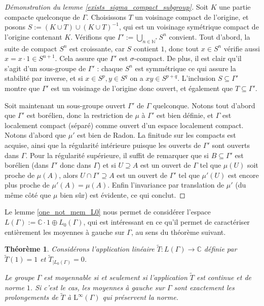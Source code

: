 \documentclass[a4paper,12pt]{article}
\newtheorem{theorem}{Théorème}[section]
\newcommand{\N}{\mathbb{N}}
\newcommand{\C}{\mathbb{C}}
\newcommand{\ssi}{si et seulement si }
\newcommand{\inv}{^{-1}}
\begin{document}
\begin{proof}[Démonstration du lemme \ref{exists_sigma_compact_subgroup}]
    Soit $K$ une partie compacte quelconque de $\Gamma$. Choisissons $T$ un voisinage compact de l'origine, 
    et posons $S := (K\cup T) \cup (K\cup T)\inv$, qui est un voisinage symétrique compact de l'origine 
    contenant $K$. Vérifions que $\Gamma' := \bigcup_{n\in\N^*} S^n$ convient. Tout d'abord, la suite de compact $S^n$ 
    est croissante, car $S$ contient $1$, donc tout $x\in S^n$ vérifie aussi $x = x\cdot 1\in S^{n+1}$. Cela assure que 
    $\Gamma'$ est $\sigma$-compact. De plus, il est clair qu'il s'agit d'un sous-groupe de $\Gamma'$ : chaque $S^n$ est
    symmétrique ce qui assure la stabilité par inverse, et si $x\in S^p, y\in S^q$ on a $xy \in S^{p+q}$. L'inclusion $S\subseteq\Gamma'$ 
    montre que $\Gamma'$ est un voisinage de l'origine donc ouvert, et également que $T\subseteq\Gamma'$.

    Soit maintenant un sous-groupe ouvert $\Gamma'$ de $\Gamma$ quelconque. Notons tout d'abord que 
    $\Gamma'$ est borélien, donc la restriction de $\mu$ à $\Gamma'$ est bien définie, et $\Gamma$ est localement compact 
    (séparé) comme ouvert d'un espace localement compact. Notons d'abord que $\mu'$ est bien de Radon. La 
    finitude sur les compacts est acquise, ainsi que la régularité intérieure puisque les ouverts de 
    $\Gamma'$ sont ouverts dans $\Gamma$. Pour la régularité supérieure, il suffit de remarquer que si 
    $B\subseteq\Gamma'$ est borélien (dans $\Gamma'$ donc dans $\Gamma$) et si $U\supseteq A$ est un ouvert de 
    $\Gamma$ tel que $\mu(U)$ soit proche de $\mu(A)$, alors $U\cap\Gamma'\supseteq A$ est un ouvert de 
    $\Gamma'$ tel que $\mu'(U)$ est encore plus proche de $\mu'(A) = \mu(A)$. Enfin l'invariance par translation de 
    $\mu'$ (du même côté que $\mu$ bien sûr) est évidente, ce qui conclut.
\end{proof}

Le lemme \ref{one_not_mem_L0} nous permet de considérer l'espace $L(\Gamma) := \C\cdot 1 \oplus L_0(\Gamma)$, qui est intéressant en ce qu'il permet de caractériser entièrement
les moyennes à gauche sur $\Gamma$, au sens du théorème suivant.

\begin{theorem}\label{left_mean_iff}
    Considérons l'application linéaire $\widetilde{T} : L(\Gamma)\to\C$ définie par $\widetilde{T}(1) = 1$
    et $\widetilde{T}_{|L_0(\Gamma)} = 0$. 
    
    Le groupe $\Gamma$ est moyennable \ssi l'application $\widetilde{T}$ est continue et de norme $1$.
    Si c'est le cas, les moyennes à gauche sur $\Gamma$ sont exactement les prolongements de $\widetilde{T}$ à 
    $\mathrm{L}^\infty(\Gamma)$ qui préservent la norme.
\end{theorem}
\end{document}
